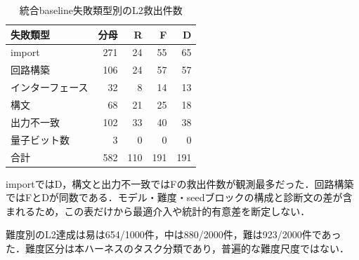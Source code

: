\begin{table}[t]\centering

\caption{統合baseline失敗類型別のL2救出件数}\label{tab:pooledcatalog}

\begin{tabular}{l|r|rrr}\hline

失敗類型 & 分母 & R & F & D \\\hline

import & 271 & 24 & 55 & 65 \\

回路構築 & 106 & 24 & 57 & 57 \\

インターフェース & 32 & 8 & 14 & 13 \\

構文 & 68 & 21 & 25 & 18 \\

出力不一致 & 102 & 33 & 40 & 38 \\

量子ビット数 & 3 & 0 & 0 & 0 \\

\hline

合計 & 582 & 110 & 191 & 191 \\\hline

\end{tabular}\end{table}

importではD，構文と出力不一致ではFの救出件数が観測最多だった．回路構築ではFとDが同数である．モデル・難度・seedブロックの構成と診断文の差が含まれるため，この表だけから最適介入や統計的有意差を断定しない．

難度別のL2達成は易は654/1000件，中は880/2000件，難は923/2000件であった．難度区分は本ハーネスのタスク分類であり，普遍的な難度尺度ではない．

